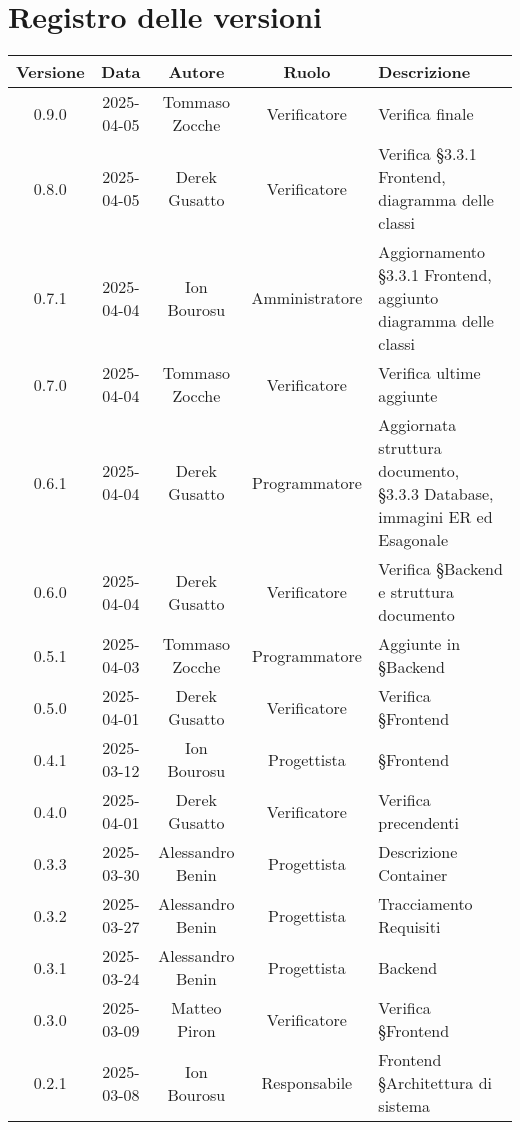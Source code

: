\section*{Registro delle versioni}

\begin{longtable}{|c|c|c|c|p{4cm}|}
    \hline
    \textbf{Versione} & \textbf{Data} & \textbf{Autore} & \textbf{Ruolo} & \textbf{Descrizione} \\
    \endhead
    \hline
    0.9.0 & 2025-04-05 & Tommaso Zocche & Verificatore & Verifica finale \\
    \hline
    0.8.0 & 2025-04-05 & Derek Gusatto & Verificatore & Verifica §3.3.1 Frontend, diagramma delle classi \\
    \hline
    0.7.1 & 2025-04-04 & Ion Bourosu & Amministratore & Aggiornamento §3.3.1 Frontend, aggiunto diagramma delle classi \\
    \hline 
    0.7.0 & 2025-04-04 & Tommaso Zocche & Verificatore & Verifica ultime aggiunte \\
    \hline 
     0.6.1 & 2025-04-04 & Derek Gusatto & Programmatore & Aggiornata struttura documento, §3.3.3 Database, immagini ER ed Esagonale \\
    \hline 
     0.6.0 & 2025-04-04 & Derek Gusatto & Verificatore & Verifica §Backend e struttura documento \\
    \hline 
    0.5.1 & 2025-04-03 & Tommaso Zocche & Programmatore & Aggiunte in §Backend \\
    \hline 
    0.5.0 & 2025-04-01 & Derek Gusatto & Verificatore & Verifica §Frontend \\
        \hline
    0.4.1 & 2025-03-12 & Ion Bourosu & Progettista & §Frontend \\ 
    \hline
    0.4.0 & 2025-04-01 &  Derek Gusatto & Verificatore & Verifica precendenti \\
    \hline
    0.3.3 & 2025-03-30 &  Alessandro Benin & Progettista & Descrizione Container \\
    \hline
0.3.2 & 2025-03-27 &  Alessandro Benin & Progettista & Tracciamento Requisiti \\
    \hline
    0.3.1 & 2025-03-24 &  Alessandro Benin & Progettista & Backend \\
    \hline
        0.3.0 & 2025-03-09 & Matteo Piron & Verificatore & Verifica §Frontend \\
        \hline
        0.2.1 & 2025-03-08 & Ion Bourosu & Responsabile & Frontend  §Architettura di sistema \\
        \hline

\end{longtable}
